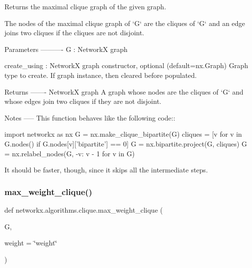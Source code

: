 \begin{DoxyVerb}Returns the maximal clique graph of the given graph.

The nodes of the maximal clique graph of `G` are the cliques of
`G` and an edge joins two cliques if the cliques are not disjoint.

Parameters
----------
G : NetworkX graph

create_using : NetworkX graph constructor, optional (default=nx.Graph)
   Graph type to create. If graph instance, then cleared before populated.

Returns
-------
NetworkX graph
    A graph whose nodes are the cliques of `G` and whose edges
    join two cliques if they are not disjoint.

Notes
-----
This function behaves like the following code::

    import networkx as nx
    G = nx.make_clique_bipartite(G)
    cliques = [v for v in G.nodes() if G.nodes[v]['bipartite'] == 0]
    G = nx.bipartite.project(G, cliques)
    G = nx.relabel_nodes(G, {-v: v - 1 for v in G})

It should be faster, though, since it skips all the intermediate
steps.\end{DoxyVerb}
 \mbox{\label{namespacenetworkx_1_1algorithms_1_1clique_a19437be8e85651bb15f27f39d9f88755}} 
\subsubsection{\texorpdfstring{max\+\_\+weight\+\_\+clique()}{max\_weight\_clique()}}
{\footnotesize\ttfamily def networkx.\+algorithms.\+clique.\+max\+\_\+weight\+\_\+clique (\begin{DoxyParamCaption}\item[{}]{G,  }\item[{}]{weight = {\ttfamily \char`\"{}weight\char`\"{}} }\end{DoxyParamCaption})}

